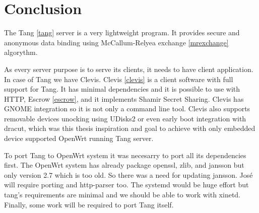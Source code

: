 \chapter{Conclusion}\label{conlusion}



The Tang \ref{tang} server is a very lightweight program.
It provides secure and anonymous data binding using McCallum-Relyea exchange \ref{mrexchange} algorythm.

As every server purpose is to serve its clients, it needs to have client application.
In case of Tang we have Clevis.
Clevis \ref{clevis} is a client software with full support for Tang.
It has minimal dependencies and it is possible to use with HTTP, Escrow \ref{escrow}, and it implements Shamir Secret Sharing.
Clevis has GNOME integration so it is not only a command line tool.
Clevis also supports removable devices unocking using UDisks2 or even early boot integration with dracut, which was this thesis inspiration and goal to achieve with only embedded device supported OpenWrt running Tang server.

To port Tang to OpenWrt system it was necesarry to port all its dependencies first.
The OpenWrt system has already package openssl, zlib, and jansson but only version 2.7 which is too old.
So there was a need for updating jansson. José will require porting and http-parser too.
The systemd would be huge effort but tang's requirements are minimal and we should be able to
work with xinetd. Finally, some work will be required to port Tang itself.
